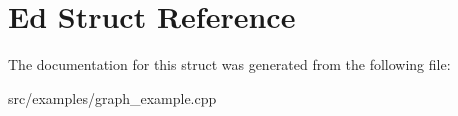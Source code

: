 \hypertarget{struct_ed}{}\section{Ed Struct Reference}
\label{struct_ed}


The documentation for this struct was generated from the following file\+:\begin{DoxyCompactItemize}
\item 
src/examples/graph\+\_\+example.\+cpp\end{DoxyCompactItemize}
